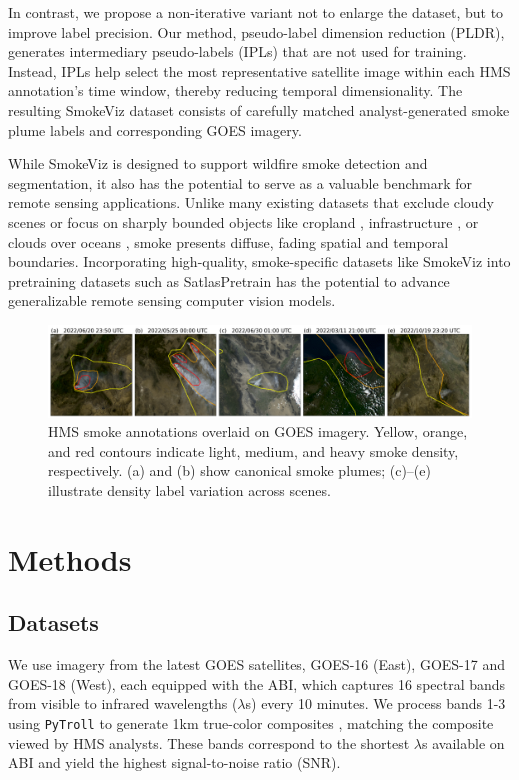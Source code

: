 \documentclass{article}
\begin{document}
In contrast, we propose a non-iterative variant not to enlarge the dataset, but to improve label precision. Our method, pseudo-label dimension reduction (PLDR), generates intermediary pseudo-labels (IPLs) that are not used for training. Instead, IPLs help select the most representative satellite image within each HMS annotation’s time window, thereby reducing temporal dimensionality. The resulting SmokeViz dataset consists of carefully matched analyst-generated smoke plume labels and corresponding GOES imagery.

While SmokeViz is designed to support wildfire smoke detection and segmentation, it also has the potential to serve as a valuable benchmark for remote sensing applications. Unlike many existing datasets that exclude cloudy scenes \cite{bigearthnet, crops} or focus on sharply bounded objects like cropland \cite{crops}, infrastructure \cite{polyworld}, or clouds over oceans \cite{cyclone, cloud_texture}, smoke presents diffuse, fading spatial and temporal boundaries. Incorporating high-quality, smoke-specific datasets like SmokeViz into pretraining datasets such as SatlasPretrain \cite{satlas} has the potential to advance generalizable remote sensing computer vision models.

\begin{figure}[!htb]
    \centering
    \includegraphics[width=\linewidth]{figures/variations_small.png}
    \caption{HMS smoke annotations overlaid on GOES imagery. Yellow, orange, and red contours indicate light, medium, and heavy smoke density, respectively. (a) and (b) show canonical smoke plumes; (c)–(e) illustrate density label variation across scenes.}
\end{figure}

\section{Methods}
\subsection{Datasets}


We use imagery from the latest GOES satellites, GOES-16 (East), GOES-17 and GOES-18 (West), each equipped with the ABI, which captures 16 spectral bands from visible to infrared wavelengths (\(\lambda\)s) every 10 minutes. We process bands 1-3 using \texttt{PyTroll} \cite{satpy} to generate 1km true-color composites \cite{true_color}, matching the composite viewed by HMS analysts. These bands correspond to the shortest \(\lambda\)s available on ABI and yield the highest signal-to-noise ratio (SNR).
\end{document}

